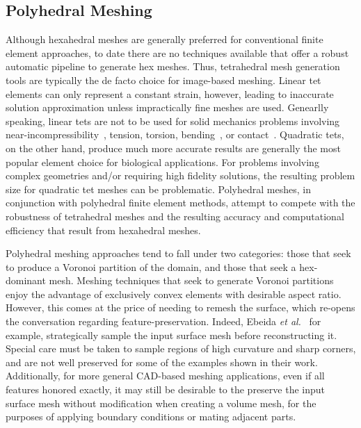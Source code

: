 \subsection{Polyhedral Meshing}
\label{Polyhedral Meshing}

Although hexahedral meshes are generally preferred for conventional finite element approaches, to date there are no techniques available that offer a robust automatic pipeline to generate hex meshes. Thus, tetrahedral mesh generation tools are typically the de facto choice for image-based meshing. Linear tet elements can only represent a constant strain, however, leading to inaccurate solution approximation unless impractically fine meshes are used. Genearlly speaking, linear tets are not to be used for solid mechanics problems involving near-incompressibility~\cite{hughes_2007}, tension, torsion, bending~\cite{wang_2004, benzley_1995}, or contact~\cite{maas_2016}. Quadratic tets, on the other hand, produce much more accurate results are generally the most popular element choice for biological applications. For problems involving complex geometries and/or requiring high fidelity solutions, the resulting problem size for quadratic tet meshes can be problematic. Polyhedral meshes, in conjunction with polyhedral finite element methods, attempt to compete with the robustness of tetrahedral meshes and the resulting accuracy and computational efficiency that result from hexahedral meshes.

Polyhedral meshing approaches tend to fall under two categories: those that seek to produce a Voronoi partition of the domain, and those that seek a hex-dominant mesh. Meshing techniques that seek to generate Voronoi partitions~\cite{garimella_2014, lee_2015} enjoy the advantage of exclusively convex elements with desirable aspect ratio. However, this comes at the price of needing to remesh the surface, which re-opens the conversation regarding feature-preservation. Indeed, Ebeida \textit{et al.}~\cite{ebeida_2011, mitchell_2015} for example, strategically sample the input surface mesh before reconstructing it. Special care must be taken to sample regions of high curvature and sharp corners, and are not well preserved for some of the examples shown in their work. Additionally, for more general CAD-based meshing applications, even if all features honored exactly, it may still be desirable to the preserve the input surface mesh without modification when creating a volume mesh, for the purposes of applying boundary conditions or mating adjacent parts.

